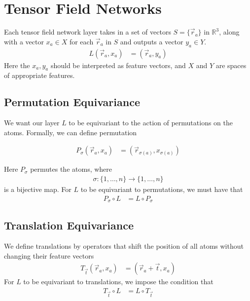 \documentclass[book.tex]{subfiles}
\begin{document}
\section{Tensor Field Networks}

Each tensor field network layer takes in a set of vectors $S = \{\vec{r}_a\}$ in $\mathbb{R}^3$, along with a vector $x_a \in X$ for each $\vec{r}_a$ in $S$ and outputs a vector $y_a \in Y$. 
\begin{align}
    L(\vec{r}_a, x_a) &= (\vec{r}_a, y_a)
\end{align}
Here the $x_a, y_a$ should be interpreted as feature vectors, and $X$ and $Y$ are spaces of appropriate features.

\subsection{Permutation Equivariance}

We want our layer $L$ to be equivariant to the action of permutations on the atoms. Formally, we can define permutation

\begin{align}
    P_\sigma(\vec{r}_a, x_a) &= (\vec{r}_{\sigma(a)}, x_{\sigma(a)})
\end{align}

Here $P_\sigma$ permutes the atoms, where 
\begin{align}
\sigma: \{1,\dotsc, n\} \to \{1,\dotsc, n\}
\end{align}
is a bijective map. For $L$ to be equivariant to permutations, we must have that
\begin{align}
    P_{\sigma} \circ L &= L \circ P_{\sigma}
\end{align}

\subsection{Translation Equivariance}

We define translations by operators that shift the position of all atoms without changing their feature vectors
\begin{align}
    T_{\vec{t}}(\vec{r}_a, x_a) &= (\vec{r}_a + \vec{t}, x_a)
\end{align}
For $L$ to be equivariant to translations, we impose the condition that
\begin{align}
    T_{\vec{t}} \circ L &= L \circ T_{\vec{t}}
\end{align}
\end{document}
